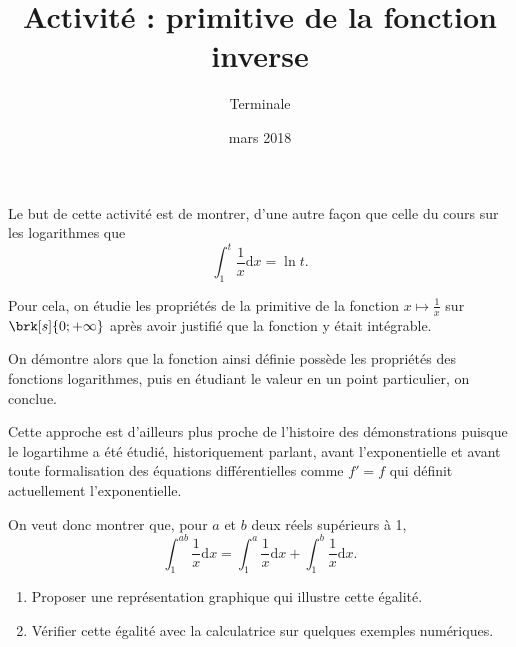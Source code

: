 \documentclass[12pt,a4paper,french]{article}
\title{Activité : primitive de la fonction inverse}
\author{Terminale}
\date{mars 2018}
\makeatletter
\renewcommand{\maketitle}%
{\framebox{%
    \begin{minipage}{0.98\linewidth}%
      \begin{center}%
        \Large \@title ~-- \@author \\%
        \@date%
      \end{center}%
  \end{minipage}}%
  \normalsize%
}
\theoremstyle{break}
\theoremstyle{break}
\theoremstyle{nonumberplain}
\makeatother
\begin{document}
\maketitle

\bigskip

Le but de cette activité est de montrer, d'une autre façon que celle du
cours sur les logarithmes que \[ \int_1^t \frac1x \mathrm{d}x = \ln t
.\]

Pour cela, on étudie les propriétés de la primitive de la fonction $x
\mapsto \frac1x$ sur $\brk[s]{0;+\infty}$ après avoir justifié que la
fonction y était intégrable.

On démontre alors que la fonction ainsi définie possède les propriétés
des fonctions logarithmes, puis en étudiant le valeur en un point
particulier, on conclue.

Cette approche est d'ailleurs plus proche de l'histoire des
démonstrations puisque le logartihme a été étudié, historiquement
parlant, avant l'exponentielle et avant toute formalisation des
équations différentielles comme $f' = f$ qui définit actuellement
l'exponentielle.

\begin{center}
\end{center}

On veut donc montrer que, pour $a$ et $b$ deux réels supérieurs à 1, \[
\int_1^{ab} \frac1x \mathrm{d}x = \int_1^a \frac1x \mathrm{d}x +
\int_1^b \frac 1x \mathrm{d}x .\]

\begin{enumerate}
  \item Proposer une représentation graphique qui illustre cette
    égalité.
  \item Vérifier cette égalité avec la calculatrice sur quelques
    exemples numériques.
\end{enumerate}

\pagebreak
\end{document}
